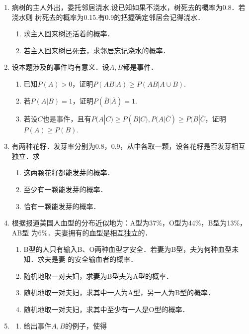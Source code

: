 \documentclass[10pt,a4paper]{article}
\begin{document}
\begin{enumerate}
    \item 病树的主人外出，委托邻居浇水.设已知如果不浇水，树死去的概率为0.8．若浇水则
    树死去的概率为0.15.有0.9的把握确定邻居会记得浇水．
    \begin{enumerate}
        \item 求主人回来树还活着的概率．
        \item 若主人回来树已死去，求邻居忘记浇水的概率．
    \end{enumerate}


    \item 设本题涉及的事件均有意义．设$A,B$都是事件．
    \begin{enumerate}
        \item 已知$P(A)>0$，证明$P(AB|A)\geq P(AB|A\cup B)$.
        \item 若$P(A|B)=1$，证明$P(\overline{B}|\overline{A})=1$.
        \item 若设$C$也是事件，且有$P(A|C)\geq P(B|C),P(A|\overline{C})\geq P(B|\overline{C}$，证明$P(A)\geq P(B)$.
    \end{enumerate}


    \item 有两种花籽．发芽率分别为0.8，0.9，从中各取一颗，设各花籽是否发芽相互独立．求
    \begin{enumerate}
        \item 这两颗花籽都能发芽的概率．
        \item 至少有一颗能发芽的概率．
        \item 恰有一颗能发芽的概率．
    \end{enumerate}



    \item 根据报道美国人血型的分布近似地为：A型为37\%，O型为44\%，B型为13\%，AB型
    为6\%．夫妻拥有的血型是相互独立的．
    \begin{enumerate}
        \item B型的人只有输入B、O两种血型才安全．若妻为B型，夫为何种血型未知．求夫是妻
        的安全输血者的概率．
        \item 随机地取一对夫妇，求妻为B型夫为A型的概率．
        \item 随机地取一对夫妇，求其中一人为A型，另一人为B型的概率．
        \item 随机地取一对夫妇，求其中至少有一人是O型的概率．
    \end{enumerate}



    \item \begin{enumerate}
        \item 给出事件$A,B$的例子，使得
        


\end{enumerate}
\end{enumerate}
\end{document}

